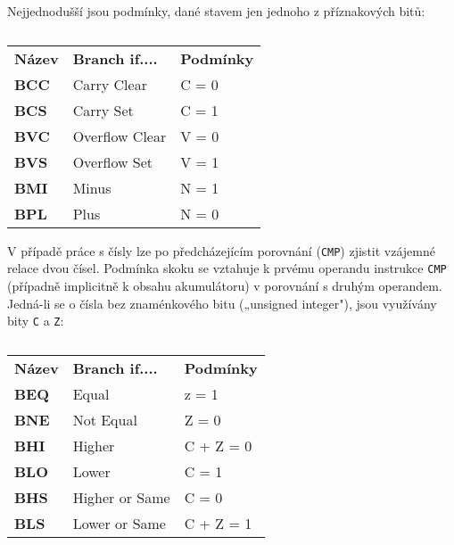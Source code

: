       Nejjednodušší jsou podmínky, dané stavem jen jednoho z příznakových bitů:
      \begin{table}[ht!]
        \begin{tabular*}{0.75\textwidth}{lll}
         \textbf{Název} & \textbf{Branch if....}  & \textbf{Podmínky}   \\ \cline{1-3}
         \textbf{BCC}   & Carry Clear      & C = 0   \\
         \textbf{BCS}   & Carry Set        & C = 1   \\
         \textbf{BVC}   & Overflow Clear   & V = 0   \\
         \textbf{BVS}   & Overflow Set     & V = 1   \\
         \textbf{BMI}   & Minus            & N = 1   \\
         \textbf{BPL}   & Plus             & N = 0   \\
        \end{tabular*}
        \caption*{ }
      \end{table}
      
      V případě práce s čísly lze po předcházejícím porovnání (\texttt{CMP}) zjistit vzájemné 
      relace dvou čísel. Podmínka skoku se vztahuje k prvému operandu instrukce \texttt{CMP} 
      (případně implicitně k obsahu akumulátoru) v porovnání s druhým operandem. Jedná-li se o 
      čísla bez znaménkového bitu („unsigned integer"), jsou využívány bity \texttt{C} a \texttt{Z}:
      
      \begin{table}[ht!]
        \begin{tabular*}{0.75\textwidth}{lll}
         \textbf{Název} & \textbf{Branch if....}  & \textbf{Podmínky}   \\ \cline{1-3}
         \textbf{BEQ}   & Equal            & z = 1       \\
         \textbf{BNE}   & Not Equal        & Z = 0       \\
         \textbf{BHI}   & Higher           & C + Z = 0   \\
         \textbf{BLO}   & Lower            & C = 1       \\
         \textbf{BHS}   & Higher or Same   & C = 0       \\
         \textbf{BLS}   & Lower or Same    & C + Z = 1   \\
        \end{tabular*}
        \caption*{ }
      \end{table}
      
